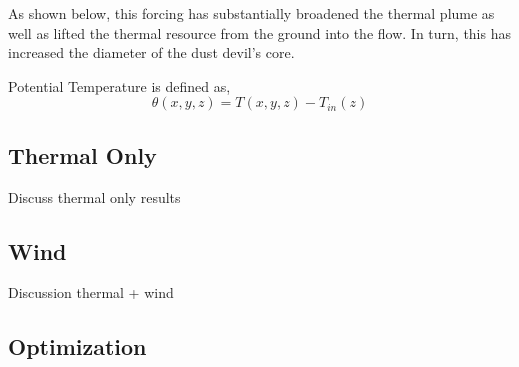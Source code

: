 As shown below, this forcing has substantially broadened the thermal
plume as well as lifted the thermal resource from the ground into the
flow. In turn, this has increased the diameter of the dust devil's
core. 

Potential Temperature is defined as,
\begin{equation}
  \theta(x,y,z) = T(x,y,z) -T_{in}(z) 
\end{equation}

\subsection{Thermal Only}

Discuss thermal only results

\subsection{Wind}

Discussion thermal + wind

\subsection{Optimization}

%
%
